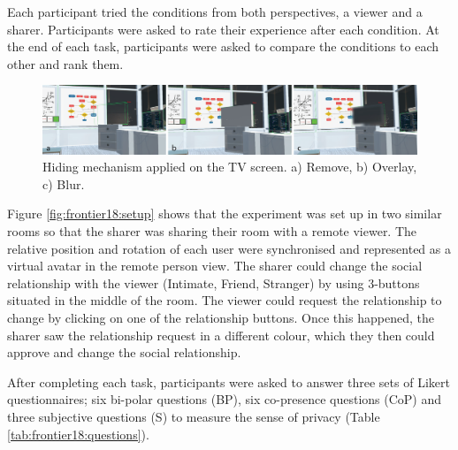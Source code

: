 Each participant tried the conditions from both perspectives, a viewer and a sharer. Participants were asked to rate their experience after each condition. At the end of each task, participants were asked to compare the conditions to each other and rank them. 

\begin{figure}
\begin{center}
\includegraphics[width=\linewidth]{images/frontier18/images-01.png}
\caption{Hiding mechanism applied on the TV screen. a) Remove, b) Overlay, c) Blur.}\label{fig:frontier18:hiding-mechanism}
\end{center}
\end{figure}

Figure \ref{fig:frontier18:setup} shows that the experiment was set up in two similar rooms so that the sharer was sharing their room with a remote viewer. The relative position and rotation of each user were synchronised and represented as a virtual avatar in the remote person view. The sharer could change the social relationship with the viewer (Intimate, Friend, Stranger) by using 3-buttons situated in the middle of the room. The viewer could request the relationship to change by clicking on one of the relationship buttons. Once this happened, the sharer saw the relationship request in a different colour, which they then could approve and change the social relationship.

After completing each task, participants were asked to answer three sets of Likert questionnaires; six bi-polar questions (BP), six co-presence questions (CoP) and three subjective questions (S) to measure the sense of privacy (Table \ref{tab:frontier18:questions}).  

